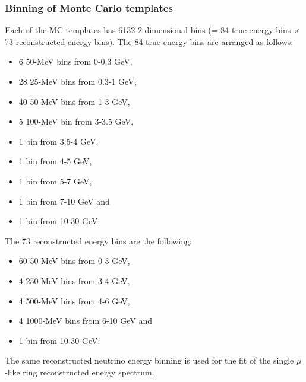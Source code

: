 \begin{itemize}
\end{itemize}



\subsubsection {Binning of Monte Carlo templates}
\label{sec:mc_templates:template_binning}

Each of the \NMCTemplate{}  MC templates has 6132 2-dimensional bins (= 84 true energy bins $\times$ 73 reconstructed energy bins).
The 84 true energy bins are arranged as follows:
\begin{itemize}
 \item   6 50-MeV bins from 0-0.3 GeV, 
 \item   28 25-MeV bins from 0.3-1 GeV, 
 \item   40 50-MeV bins from 1-3 GeV, 
 \item   5 100-MeV bin from 3-3.5 GeV, 
 \item   1 bin from 3.5-4 GeV, 
 \item   1 bin from 4-5 GeV, 
 \item   1 bin from 5-7 GeV, 
 \item   1 bin from 7-10 GeV and
 \item   1 bin from 10-30 GeV.
\end{itemize}

The 73 reconstructed energy bins are the following:
\begin{itemize}
 \item   60 50-MeV bins from 0-3 GeV, 
 \item   4 250-MeV bins from 3-4 GeV, 
 \item   4 500-MeV bins from 4-6 GeV, 
 \item   4 1000-MeV bins from 6-10 GeV and
 \item   1 bin from 10-30 GeV.
\end{itemize}
The same reconstructed neutrino energy binning is used for the fit of the single $\mu$-like ring reconstructed energy spectrum.

